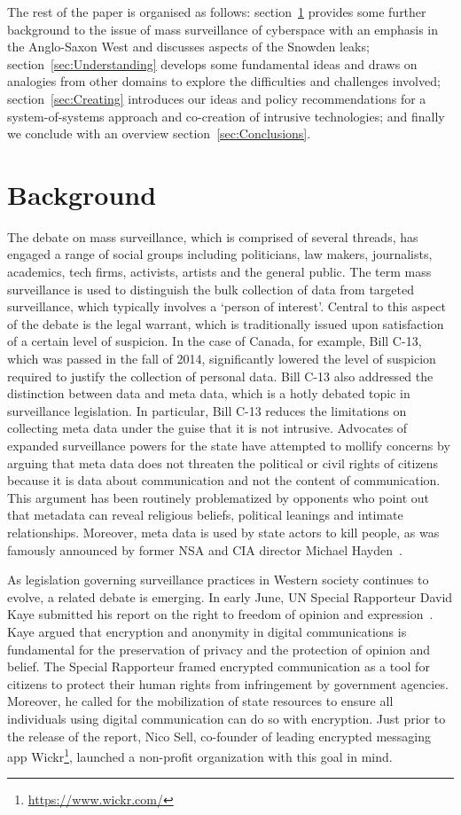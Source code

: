 \documentclass{llncs}
\begin{document}
The rest of the paper is organised as follows: section~\ref{sec:Background} provides some further background to the issue of mass surveillance of cyberspace with an emphasis in the Anglo-Saxon West and discusses aspects of the Snowden leaks; section~\ref{sec:Understanding} develops some fundamental ideas and draws on analogies from other domains to explore the difficulties and challenges involved; section~\ref{sec:Creating} introduces our ideas and policy recommendations for a system-of-systems approach and co-creation of intrusive technologies; and finally we conclude with an overview section~\ref{sec:Conclusions}.

\section{Background}
\label{sec:Background}
The debate on mass surveillance, which is comprised of several threads, has engaged a range of social groups including politicians, law makers, journalists, academics, tech firms, activists, artists and the general public. The term mass surveillance is used to distinguish the bulk collection of data from targeted surveillance, which typically involves a `person of interest'. Central to this aspect of the debate is the legal warrant, which is traditionally issued upon satisfaction of a certain level of suspicion. In the case of Canada, for example, Bill C-13, which was passed in the fall of 2014, significantly lowered the level of suspicion required to justify the collection of personal data. Bill C-13 also addressed the distinction between data and meta data, which is a hotly debated topic in surveillance legislation. In particular, Bill C-13 reduces the limitations on collecting meta data under the guise that it is not intrusive. Advocates of expanded surveillance powers for the state have attempted to mollify concerns by arguing that meta data does not threaten the political or civil rights of citizens because it is data about communication and not the content of communication. This argument has been routinely problematized by opponents who point out that metadata can reveal religious beliefs, political leanings and intimate relationships. Moreover, meta data is used by state actors to kill people, as was famously announced by former NSA and CIA director Michael Hayden~\cite{Hayden}. 

As legislation governing surveillance practices in Western society continues to evolve, a related debate is emerging. In early June, UN Special Rapporteur David Kaye submitted his report on the right to freedom of opinion and expression~\cite{Kaye}. Kaye argued that encryption and anonymity in digital communications is fundamental for the preservation of privacy and the protection of opinion and belief. The Special Rapporteur framed encrypted communication as a tool for citizens to protect their human rights from infringement by government agencies. Moreover, he called for the mobilization of state resources to ensure all individuals using digital communication can do so with encryption. Just prior to the release of the report, Nico Sell, co-founder of leading encrypted messaging app Wickr\footnote{\url{https://www.wickr.com/}}, launched a non-profit organization with this goal in mind. 
\end{document}
